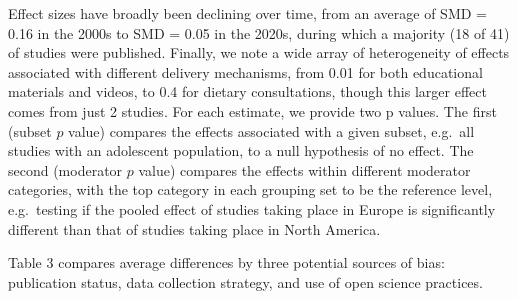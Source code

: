 \documentclass[sn-nature,referee,pdflatex]{sn-jnl}
\begin{document}
Effect sizes have broadly been declining over time, from an average of
SMD = 0.16 in the 2000s to SMD = 0.05 in the 2020s, during which a
majority (18 of 41) of studies were published. Finally, we note a wide
array of heterogeneity of effects associated with different delivery
mechanisms, from 0.01 for both educational materials and videos, to 0.4
for dietary consultations, though this larger effect comes from just 2
studies. For each estimate, we provide two p values. The first (subset
\(p\) value) compares the effects associated with a given subset,
e.g.~all studies with an adolescent population, to a null hypothesis of
no effect. The second (moderator \(p\) value) compares the effects
within different moderator categories, with the top category in each
grouping set to be the reference level, e.g.~testing if the pooled
effect of studies taking place in Europe is significantly different than
that of studies taking place in North America.

Table 3 compares average differences by three potential sources of bias:
publication status, data collection strategy, and use of open science
practices.
\end{document}
